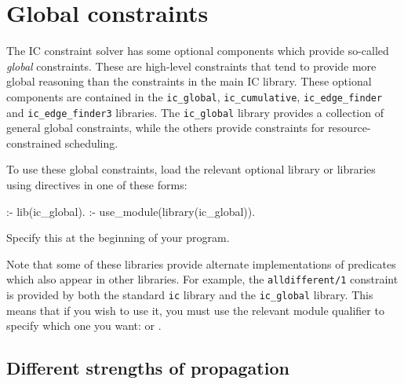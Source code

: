 
\section{Global constraints}
\label{secglobal}


The IC constraint solver has some optional components which provide
so-called \emph{global} constraints.  These are high-level constraints that
tend to provide more global reasoning than the constraints in the main IC
library.  These optional components are contained in the \texttt{ic_global},
\texttt{ic_cumulative},
\texttt{ic_edge_finder}
and \texttt{ic_edge_finder3}
libraries.  The \texttt{ic_global} library provides a collection of general
global constraints, while the others provide constraints for
resource-constrained scheduling.

To use these global constraints, load the relevant optional library or
libraries using directives in one of these forms:
\begin{code}
:- lib(ic_global).
:- use_module(library(ic_global)).
\end{code}
Specify this at the beginning of your program.

Note that some of these libraries provide alternate implementations of
predicates which also appear in other libraries.  For example, the
\texttt{alldifferent/1} constraint is provided by both the standard
\texttt{ic} library and the \texttt{ic_global} library.  This means that if
you wish to use it, you must use the relevant module qualifier to specify
which one you want:
 or 
.




\subsection{Different strengths of propagation}

